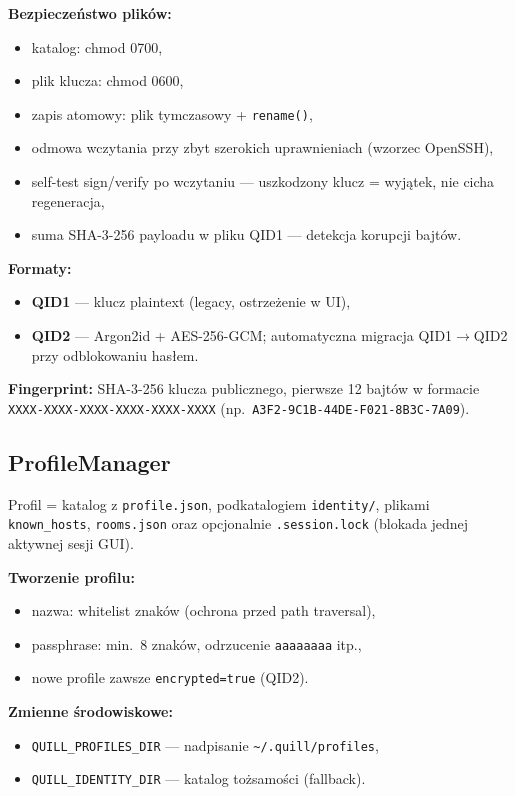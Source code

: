 \documentclass[12pt,a4paper]{article}
\begin{document}
\textbf{Bezpieczeństwo plików:}
\begin{itemize}
    \item katalog: chmod 0700,
    \item plik klucza: chmod 0600,
    \item zapis atomowy: plik tymczasowy + \texttt{rename()},
    \item odmowa wczytania przy zbyt szerokich uprawnieniach (wzorzec OpenSSH),
    \item self-test sign/verify po wczytaniu --- uszkodzony klucz = wyjątek, nie cicha regeneracja,
    \item suma SHA-3-256 payloadu w pliku QID1 --- detekcja korupcji bajtów.
\end{itemize}

\textbf{Formaty:}
\begin{itemize}
    \item \textbf{QID1} --- klucz plaintext (legacy, ostrzeżenie w UI),
    \item \textbf{QID2} --- Argon2id + AES-256-GCM; automatyczna migracja QID1$\rightarrow$QID2 przy odblokowaniu hasłem.
\end{itemize}

\textbf{Fingerprint:} SHA-3-256 klucza publicznego, pierwsze 12 bajtów w formacie \texttt{XXXX-XXXX-XXXX-XXXX-XXXX-XXXX} (np.\ \texttt{A3F2-9C1B-44DE-F021-8B3C-7A09}).

\subsection{ProfileManager}

Profil = katalog z \texttt{profile.json}, podkatalogiem \texttt{identity/}, plikami \texttt{known\_hosts}, \texttt{rooms.json} oraz opcjonalnie \texttt{.session.lock} (blokada jednej aktywnej sesji GUI).

\textbf{Tworzenie profilu:}
\begin{itemize}
    \item nazwa: whitelist znaków (ochrona przed path traversal),
    \item passphrase: min.\ 8 znaków, odrzucenie \texttt{aaaaaaaa} itp.,
    \item nowe profile zawsze \texttt{encrypted=true} (QID2).
\end{itemize}

\textbf{Zmienne środowiskowe:}
\begin{itemize}
    \item \texttt{QUILL\_PROFILES\_DIR} --- nadpisanie \texttt{\textasciitilde/.quill/profiles},
    \item \texttt{QUILL\_IDENTITY\_DIR} --- katalog tożsamości (fallback).
\end{itemize}
\end{document}
